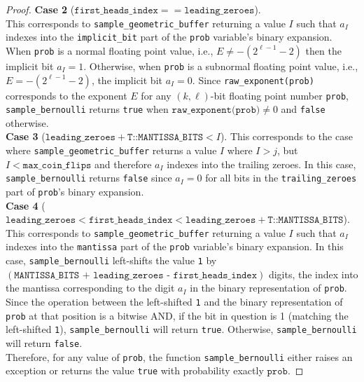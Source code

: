 \documentclass{article}
\begin{document}
\begin{proof}
\noindent\textbf{Case 2} ($\texttt{first\_heads\_index} == \texttt{leading\_zeroes}$). \\
\noindent This corresponds to \texttt{sample\_geometric\_buffer} returning a value $I$ such that $a_I$ indexes into the \texttt{implicit\_bit} part of the  \texttt{prob} variable's binary expansion. When \texttt{prob} is a normal floating point value, i.e., $E \ne -(2^{\ell -1} - 2)$ then the implicit bit $a_I = 1$. Otherwise, when \texttt{prob} is a subnormal floating point value, i.e., $E = -(2^{\ell - 1} - 2)$, the implicit bit $a_I = 0$. Since \texttt{raw\_exponent(prob)} corresponds to the exponent $E$ for any $(k,\ell)$-bit floating point number \texttt{prob}, \texttt{sample\_bernoulli} returns \texttt{true} when $\texttt{raw\_exponent(prob)} \ne 0$ and \texttt{false} otherwise. \\


\noindent\textbf{Case 3} ($\texttt{leading\_zeroes}  + \texttt{T::MANTISSA\_BITS} < I$). This corresponds to the case where  \texttt{sample\_geometric\_buffer} returns a value $I$ where $I > j$, but $I < \texttt{max\_coin\_flips}$ and therefore $a_I$ indexes into the trailing zeroes. In this case, \texttt{sample\_bernoulli} returns \texttt{false} since $a_I = 0$ for all bits in the \texttt{trailing\_zeroes} part of \texttt{prob}'s binary expansion. \\

\noindent\textbf{Case 4} ($ \texttt{leading\_zeroes} < \texttt{first\_heads\_index}  <  \texttt{leading\_zeroes}  + \texttt{T::MANTISSA\_BITS}$). \\
\noindent This corresponds to \texttt{sample\_geometric\_buffer} returning a value $I$ such that $a_I$ indexes into the \texttt{mantissa} part of the  \texttt{prob} variable's binary expansion. In this case,
\texttt{sample\_bernoulli}  left-shifts the value \texttt{1} by  $(\texttt{MANTISSA\_BITS + leading\_zeroes - first\_heads\_index})$ digits, the index into the mantissa corresponding to the digit $a_I$ in the binary representation of \texttt{prob}. Since the operation between the left-shifted \texttt{1} and the binary representation of \texttt{prob} at that position is a bitwise AND, if the bit in question is 1 (matching the left-shifted \texttt{1}), \texttt{sample\_bernoulli} will return \texttt{true}. Otherwise, \texttt{sample\_bernoulli} will return \texttt{false}. \\


\noindent Therefore, for any value of \texttt{prob}, the function \texttt{sample\_bernoulli} either raises an exception or returns the value \texttt{true} with probability exactly $\texttt{prob}$.
\end{proof}
\end{document}
